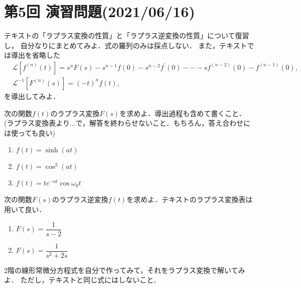 \section*{第5回 演習問題(2021/06/16)}
%
\enshu
%
テキストの「ラプラス変換の性質」と「ラプラス逆変換の性質」について復習し，
自分なりにまとめてみよ．式の羅列のみは採点しない．
また，テキストでは導出を省略した
\begin{align}
 &\mathcal{L}\left[f^{(n)}(t)\right] = s^n F(s) - s^{n-1}f(0) - s^{n-2}f^{\prime}(0) - \cdots -sf^{(n-2)}(0) - f^{(n-1)}(0), \\
 &\mathcal{L}^{-1}\left[F^{(n)}(s)\right] = (-t)^{n}f(t),
\end{align}
を導出してみよ．

%
\enshu
%
次の関数$f(t)$のラプラス変換$F(s)$を求めよ．導出過程も含めて書くこと．
(ラプラス変換表より...で，解答を終わらせないこと．もちろん，答え合わせには使っても良い)
\begin{enumerate}[(1)]
  \item $f(t) = \sinh(at)$
  \item $f(t) = \cos^{2}(at)$
  \item $f(t) = te^{-at}\cos\omega_0 t$
\end{enumerate}
%
\enshu
%
次の関数$F(s)$のラプラス逆変換$f(t)$を求めよ．テキストのラプラス変換表は用いて良い．
\begin{enumerate}[(1)]
  \item $F(s) = \dfrac{1}{s-2}$
  \item $F(s) = \dfrac{1}{s^2+2s}$
\end{enumerate}
%
\enshu
%
2階の線形常微分方程式を自分で作ってみて，それをラプラス変換で解いてみよ．
ただし，テキストと同じ式にはしないこと．
